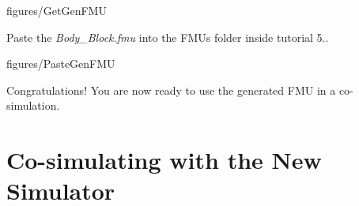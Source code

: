 \documentclass[11pt,a4paper]{../tutorial}
\begin{document}
\begin{instructions}
   \begin{annotation}[width=0.8\linewidth]{figures/GetGenFMU}
   \end{annotation}

\item \label{step:exp2}  Paste the \emph{Body\_Block.fmu} into the FMUs folder inside tutorial 5..

   \begin{annotation}[width=0.8\linewidth]{figures/PasteGenFMU}
   \end{annotation}

Congratulations! You are now ready to use the generated FMU in a co-simulation. 
\end{instructions}


\newpage

\section{Co-simulating with the New Simulator}
\label{sec:cosim}
\end{document}
